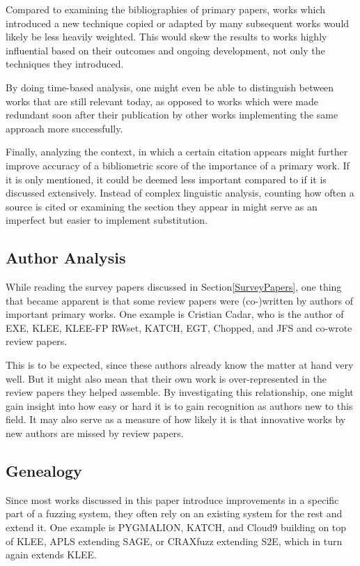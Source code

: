\documentclass{article}
\begin{document}
\begin{multicols}{2}
    Compared to examining the bibliographies of primary papers, works which introduced a new technique copied or adapted by many subsequent works would likely be less heavily weighted. This would skew the results to works highly influential based on their outcomes and ongoing development, not only the techniques they introduced.

    By doing time-based analysis, one might even be able to distinguish between works that are still relevant today, as opposed to works which were made redundant soon after their publication by other works implementing the same approach more successfully.

    Finally, analyzing the context, in which a certain citation appears might further improve accuracy of a bibliometric score of the importance of a primary work. If it is only mentioned, it could be deemed less important compared to if it is discussed extensively. Instead of complex linguistic analysis, counting how often a source is cited or examining the section they appear in might serve as an imperfect but easier to implement substitution.

    \subsection{Author Analysis}
    While reading the survey papers discussed in Section\ref{SurveyPapers}, one thing that became apparent is that some review papers were (co-)written by authors of important primary works. One example is Cristian Cadar, who is the author of EXE\cite{EXE}, KLEE\cite{KLEE}, KLEE-FP\cite{KLEEFP} RWset\cite{RWset}, KATCH\cite{KATCH}, EGT\cite{EGT}, Chopped\cite{Chopped}, and JFS\cite{JFS} and co-wrote review papers\cite{ReviewThreeDecades, ChallengesAndReflections, PreliminaryAssessment}.

    This is to be expected, since these authors already know the matter at hand very well. But it might also mean that their own work is over-represented in the review papers they helped assemble. By investigating this relationship, one might gain insight into how easy or hard it is to gain recognition as authors new to this field. It may also serve as a measure of how likely it is that innovative works by new authors are missed by review papers.

    \subsection{Genealogy}
    Since most works discussed in this paper introduce improvements in a specific part of a fuzzing system, they often rely on an existing system for the rest and extend it. One example is PYGMALION\cite{PYGMALION}, KATCH\cite{KATCH}, and Cloud9\cite{Cloud9} building on top of KLEE\cite{KLEE}, APLS\cite{APLS} extending SAGE\cite{SAGE}, or CRAXfuzz\cite{CRAXfuzz} extending S2E\cite{S2E}, which in turn again extends KLEE\cite{KLEE}.


\end{multicols}
\end{document}
